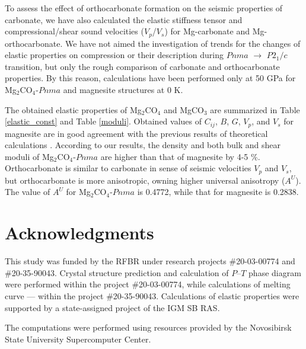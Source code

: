 \documentclass[a4paperm]{article}
\begin{document}
To assess the effect of orthocarbonate formation on the seismic properties of carbonate, we have also calculated the elastic stiffness tensor and compressional/shear sound velocities ($V_p$/$V_s$) for Mg-carbonate and Mg-orthocarbonate.
We have not aimed the investigation of trends for the changes of elastic properties on compression or their description during $Pnma$ $\to$ $P2_1/c$ transition, but only the rough comparison of carbonate and orthocarbonate properties.
By this reason, calculations have been performed only at 50 GPa for Mg$_2$CO$_4$-$Pnma$ and magnesite structures at 0 K.

The obtained elastic properties of Mg$_2$CO$_4$ and MgCO$_3$ are summarized in Table \ref{elastic_const} and Table \ref{moduli}.
Obtained values of $C_{ij}$, $B$, $G$, $V_p$, and $V_s$ for magnesite are in good agreement with the previous results of theoretical calculations \cite{li2020_mgco3}.
According to our results, the density and both bulk and shear moduli of Mg$_2$CO$_4$-$Pnma$ are higher than that of magnesite by 4-5 \%.
Orthocarbonate is similar to carbonate in sense of seismic velocities $V_p$ and $V_s$, but orthocarbonate is more anisotropic, owning higher universal anisotropy ($A^U$).
The value of $A^U$ for Mg$_2$CO$_4$-$Pnma$ is 0.4772, while that for magnesite is 0.2838.


\section*{Acknowledgments}
This study was funded by the RFBR under research projects \#20-03-00774 and \#20-35-90043.
Crystal structure prediction and calculation of $P$--$T$ phase diagram were performed within the project \#20-03-00774, while calculations of melting curve --- within the project \#20-35-90043.
Calculations of elastic properties were supported by a state-assigned project of the IGM SB RAS. 

The computations were performed using resources provided by the Novosibirsk State University Supercomputer Center.




\end{document}
